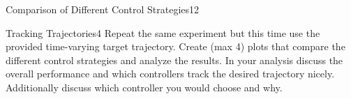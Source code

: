 \begin{questions}
\begin{question}{Comparison of Different Control Strategies}{12}
\begin{answer}
\end{answer}
		
	\end{question}
	
	
	\begin{question}{Tracking Trajectories}{4}
		Repeat the same experiment but this time use the provided time-varying target trajectory. Create (max 4) plots that compare the different control strategies and analyze the results. In your analysis discuss the overall performance and which controllers track the desired trajectory nicely. Additionally discuss which controller you would choose and why.
		

\end{question}
\end{questions}
